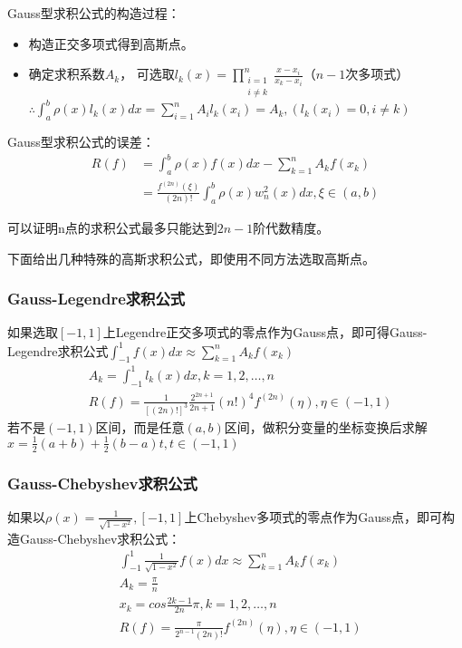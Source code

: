 \documentclass[a4paper]{article}
\begin{document}
Gauss型求积公式的构造过程：
\begin{itemize}
    \item 构造正交多项式得到高斯点。
    \item 确定求积系数$A_k$，
        可选取$l_k(x)=\prod^n_{\substack{i=1\\i\neq k}}\frac{x-x_i}{x_k-x_i} $（$n-1$次多项式）\\
        $\therefore \int^b_a\rho(x)l_k(x)dx=\sum^n_{i=1}A_il_k(x_i)=A_k, (l_k(x_i)=0, i\neq k)$
\end{itemize}

Gauss型求积公式的误差：
\begin{equation*}
    \begin{split}
        R(f)&=\int^b_a\rho(x)f(x)dx - \sum^n_{k=1}A_kf(x_k) \\
        &= \frac{f^{(2n)}(\xi)}{(2n)!}\int^b_a\rho(x)w_n^2(x)dx, \xi \in (a,b)
    \end{split}
\end{equation*}

可以证明n点的求积公式最多只能达到$2n-1$阶代数精度。

下面给出几种特殊的高斯求积公式，即使用不同方法选取高斯点。

\subsubsection{Gauss-Legendre求积公式}
如果选取$[-1,1]$上Legendre正交多项式的零点作为Gauss点，即可得Gauss-Legendre求积公式$\int^1_{-1}f(x)dx\approx \sum^n_{k=1}A_kf(x_k) $
\begin{align}
    &A_k=\int^1_{-1}l_k(x)dx, k=1,2,\dots, n \\
    &R(f) = \frac{1}{[(2n)!]^3}\frac{2^{2n+1}}{2n+1}(n!)^4f^{(2n)}(\eta), \eta \in (-1,1)
\end{align}
若不是$(-1,1)$区间，而是任意$(a,b)$区间，做积分变量的坐标变换后求解$x=\frac{1}{2}(a+b)+\frac{1}{2}(b-a)t, t\in(-1,1)$

\subsubsection{Gauss-Chebyshev求积公式}
如果以$\rho(x)=\frac{1}{\sqrt{1-x^2}},[-1,1]$上Chebyshev多项式的零点作为Gauss点，即可构造Gauss-Chebyshev求积公式：
\begin{align*}
    &\int^1_{-1}\frac{1}{\sqrt{1-x^2}}f(x)dx \approx \sum^n_{k=1}A_kf(x_k) \\
    &A_k=\frac{\pi}{n} \\
    &x_k=cos\frac{2k-1}{2n}\pi, k=1,2,\dots,n\\
    &R(f) = \frac{\pi}{2^{n-1}(2n)!}f^{(2n)}(\eta), \eta \in(-1,1)
\end{align*}
\end{document}
